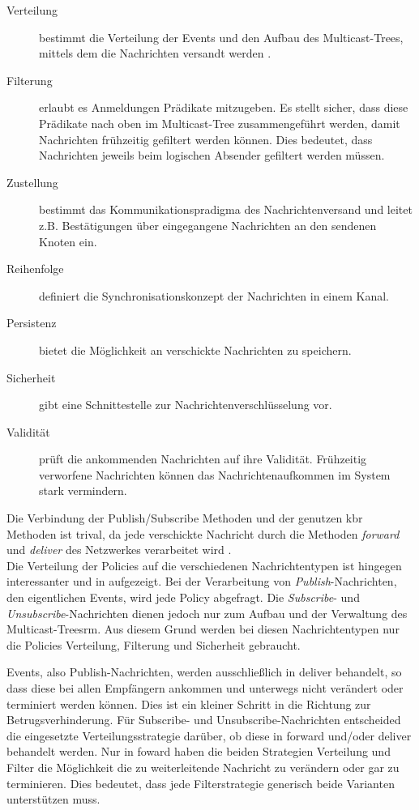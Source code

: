 \begin{description}
\item[Verteilung] bestimmt die Verteilung der Events und den Aufbau des Multicast-Trees, mittels dem die Nachrichten versandt werden \cite{KostasKatrinis2005}.
\item[Filterung] erlaubt es Anmeldungen Prädikate mitzugeben. Es stellt sicher, dass diese Prädikate nach oben im Multicast-Tree zusammengeführt werden, damit Nachrichten frühzeitig gefiltert werden können. Dies bedeutet, dass Nachrichten jeweils beim logischen Absender gefiltert werden müssen.
\item[Zustellung] bestimmt das Kommunikationspradigma des Nachrichtenversand und leitet z.B. Bestätigungen über eingegangene Nachrichten an den sendenen Knoten ein.
\item[Reihenfolge] definiert die Synchronisationskonzept der Nachrichten in einem Kanal.
\item[Persistenz] bietet die Möglichkeit an verschickte Nachrichten zu speichern.
\item[Sicherheit] gibt eine Schnittestelle zur Nachrichtenverschlüsselung vor.
\item[Validität] prüft die ankommenden Nachrichten auf ihre Validität. Frühzeitig verworfene Nachrichten können das Nachrichtenaufkommen im System stark vermindern.
\end{description}

Die Verbindung der Publish/Subscribe Methoden und der genutzen \ac{kbr} Methoden ist trival, da jede verschickte Nachricht durch die Methoden \emph{forward} und \emph{deliver} des Netzwerkes verarbeitet wird \cite{Dabek2003Towards}.\\
Die Verteilung der Policies auf die verschiedenen Nachrichtentypen ist hingegen interessanter und in  aufgezeigt. Bei der Verarbeitung von \emph{Publish}-Nachrichten, den eigentlichen Events, wird jede Policy abgefragt. Die \emph{Subscribe}- und \emph{Unsubscribe}-Nachrichten dienen jedoch nur zum Aufbau und der Verwaltung des Multicast-Treesrm. Aus diesem Grund werden bei diesen Nachrichtentypen nur die Policies Verteilung, Filterung und Sicherheit gebraucht.

Events, also Publish-Nachrichten, werden ausschließlich in deliver behandelt, so dass diese bei allen Empfängern ankommen und unterwegs nicht verändert oder terminiert werden können. Dies ist ein kleiner Schritt in die Richtung zur Betrugsverhinderung. Für Subscribe- und Unsubscribe-Nachrichten entscheided die eingesetzte Verteilungsstrategie darüber, ob diese in forward und/oder deliver behandelt werden. Nur in foward haben die beiden Strategien Verteilung und Filter die Möglichkeit die zu weiterleitende Nachricht zu verändern oder gar zu terminieren. Dies bedeutet, dass jede Filterstrategie generisch beide Varianten unterstützen muss.


